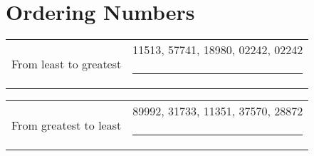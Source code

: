 \documentclass[11pt]{article}
\begin{document}
\section{Ordering Numbers}

\begin{tabular}{r l}
    \multirow{2}{*}{From least to greatest} & 11513, 57741, 18980, 02242, 02242 \\
    & \rule{7cm}{0.5pt} \\
\end{tabular}

\noindent \begin{tabular}{r l}
    \multirow{2}{*}{From greatest to least} & 89992, 31733, 11351, 37570, 28872 \\
    & \rule{7cm}{0.5pt} \\
\end{tabular}
\end{document}

